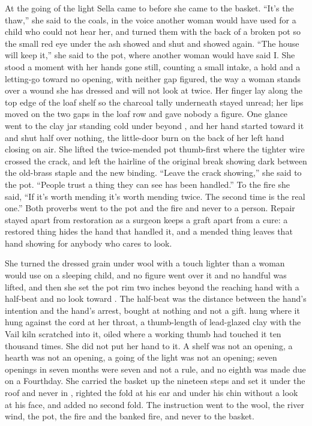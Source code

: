 At the going of the light Sella came to  before she came to the basket. “It's the thaw,” she said to the coals, in the voice another woman would have used for a child who could not hear her, and turned them with the back of a broken pot so the small red eye under the ash showed and shut and showed again. “The house will keep it,” she said to the pot, where another woman would have said I. She stood a moment with her hands gone still, counting a small intake, a hold and a letting-go toward no opening, with neither gap figured, the way a woman stands over a wound she has dressed and will not look at twice. Her finger lay along the top edge of the loaf shelf so the charcoal tally underneath stayed unread; her lips moved on the two gaps in the loaf row and gave nobody a figure. One glance went to the clay jar standing cold under  beyond , and her hand started toward it and shut half over nothing, the little-door burn on the back of her left hand closing on air. She lifted the twice-mended pot thumb-first where the tighter wire crossed the crack, and left the hairline of the original break showing dark between the old-brass staple and the new binding. “Leave the crack showing,” she said to the pot. “People trust a thing they can see has been handled.” To the fire she said, “If it's worth mending it's worth mending twice. The second time is the real one.” Both proverbs went to the pot and the fire and never to a person. Repair stayed apart from restoration as a surgeon keeps a graft apart from a cure: a restored thing hides the hand that handled it, and a mended thing leaves that hand showing for anybody who cares to look.

She turned the dressed grain under wool with a touch lighter than a woman would use on a sleeping child, and no figure went over it and no handful was lifted, and then she set the pot rim two inches beyond the reaching hand with a half-beat and no look toward . The half-beat was the distance between the hand's intention and the hand's arrest, bought at nothing and not a gift.  hung where it hung against the cord at her throat, a thumb-length of lead-glazed clay with the Vail kiln scratched into it, oiled where a working thumb had touched it ten thousand times. She did not put her hand to it. A shelf was not an opening, a hearth was not an opening, a going of the light was not an opening; seven openings in seven months were seven and not a rule, and no eighth was made due on a Fourthday. She carried the basket up the nineteen steps and set it under the roof and never in , righted the fold at his ear and under his chin without a look at his face, and added no second fold. The instruction went to the wool, the river wind, the pot, the fire and the banked fire, and never to the basket.

